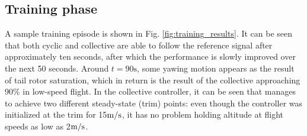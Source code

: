 \subsection{Training phase}
A sample training episode is shown in Fig. \ref{fig:training_results}. It can be seen that both cyclic and collective are able to follow the reference signal after approximately ten seconds, after which the performance is slowly improved over the next 50 seconds. Around $t=90\si{\second}$, some yawing motion appears as the result of tail rotor saturation, which in return is the result of the collective approaching 90\% in low-speed flight. In the collective controller, it can be seen that manages to achieve two different steady-state (trim) points: even though the controller was initialized at the trim for 15$\si[per-mode=symbol]{\meter \per \second}$, it has no problem holding altitude at flight speeds as low as 2$\si[per-mode=symbol]{\meter \per \second}$.

